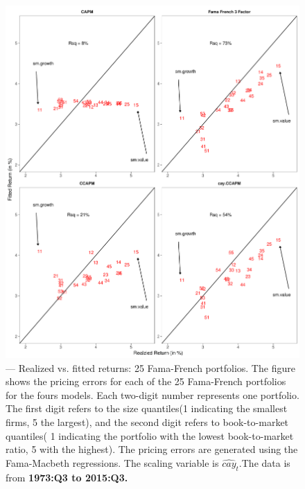 \documentclass[12pt]{article}
\begin{document}
\begin{figure}[htbp]
\begin{center}
\includegraphics[scale=0.6]{fig1_full.pdf}
\caption{--- Realized vs. fitted returns: 25 Fama-French portfolios. The figure shows the pricing errors for each of the 25 Fama-French portfolios for the fours models. Each two-digit number represents one portfolio. The first digit refers to the size quantiles(1 indicating the smallest firms, 5 the largest), and the second digit refers to book-to-market quantiles( 1 indicating the portfolio with the lowest book-to-market ratio, 5 with the highest). The pricing errors are generated using the Fama-Macbeth regressions. The scaling variable is $\widehat{cay}_t$.The data is from \bf{1973:Q3 to 2015:Q3.}}
\label{fig:new}
\end{center}
\end{figure}
\end{document}

